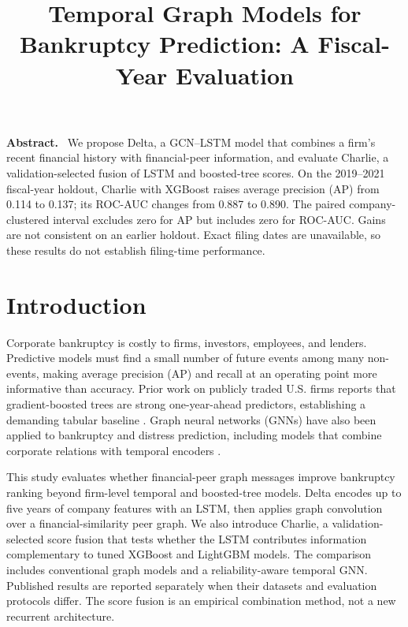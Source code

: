\documentclass[conference]{IEEEtran}
\title{Temporal Graph Models for Bankruptcy Prediction: A Fiscal-Year Evaluation}
\author{\IEEEauthorblockN{Atharv Shanker, Vedang Pandey, and Shoumik Mitra}}
\renewenvironment{abstract}{\small\noindent\textbf{Abstract.}\ }{\par\smallskip}
\begin{document}
\maketitle

\begin{abstract}
We propose Delta, a GCN--LSTM model that combines a firm's recent financial history with financial-peer information, and evaluate Charlie, a validation-selected fusion of LSTM and boosted-tree scores. On the 2019--2021 fiscal-year holdout, Charlie with XGBoost raises average precision (AP) from 0.114 to 0.137; its ROC-AUC changes from 0.887 to 0.890. The paired company-clustered interval excludes zero for AP but includes zero for ROC-AUC. Gains are not consistent on an earlier holdout. Exact filing dates are unavailable, so these results do not establish filing-time performance.
\end{abstract}

\section{Introduction}
Corporate bankruptcy is costly to firms, investors, employees, and lenders. Predictive models must find a small number of future events among many non-events, making average precision (AP) and recall at an operating point more informative than accuracy. Prior work on publicly traded U.S. firms reports that gradient-boosted trees are strong one-year-ahead predictors, establishing a demanding tabular baseline \cite{alanis2022benchmark}. Graph neural networks (GNNs) have also been applied to bankruptcy and distress prediction, including models that combine corporate relations with temporal encoders \cite{zhao2023comrisk,sun2026rahtgnn}.

This study evaluates whether financial-peer graph messages improve bankruptcy ranking beyond firm-level temporal and boosted-tree models. Delta encodes up to five years of company features with an LSTM, then applies graph convolution over a financial-similarity peer graph. We also introduce Charlie, a validation-selected score fusion that tests whether the LSTM contributes information complementary to tuned XGBoost and LightGBM models. The comparison includes conventional graph models and a reliability-aware temporal GNN. Published results are reported separately when their datasets and evaluation protocols differ. The score fusion is an empirical combination method, not a new recurrent architecture.
\end{document}

